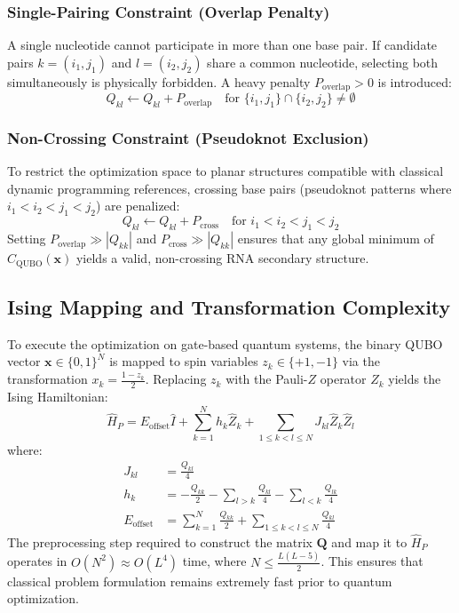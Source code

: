 \documentclass[11pt,a4paper]{article}
\begin{document}
	\subsubsection{Single-Pairing Constraint (Overlap Penalty)}
	A single nucleotide cannot participate in more than one base pair. If candidate pairs $k = (i_1, j_1)$ and $l = (i_2, j_2)$ share a common nucleotide, selecting both simultaneously is physically forbidden. A heavy penalty $P_{\text{overlap}} > 0$ is introduced:
	\begin{equation}
		Q_{kl} \gets Q_{kl} + P_{\text{overlap}} \quad \text{for } \{i_1, j_1\} \cap \{i_2, j_2\} \neq \emptyset
	\end{equation}
	
	\subsubsection{Non-Crossing Constraint (Pseudoknot Exclusion)}
	To restrict the optimization space to planar structures compatible with classical dynamic programming references, crossing base pairs (pseudoknot patterns where $i_1 < i_2 < j_1 < j_2$) are penalized:
	\begin{equation}
		Q_{kl} \gets Q_{kl} + P_{\text{cross}} \quad \text{for } i_1 < i_2 < j_1 < j_2
	\end{equation}
	Setting $P_{\text{overlap}} \gg |Q_{kk}|$ and $P_{\text{cross}} \gg |Q_{kk}|$ ensures that any global minimum of $C_{\text{QUBO}}(\mathbf{x})$ yields a valid, non-crossing RNA secondary structure.
	
	\subsection{Ising Mapping and Transformation Complexity}
	
	To execute the optimization on gate-based quantum systems, the binary QUBO vector $\mathbf{x} \in \{0, 1\}^N$ is mapped to spin variables $z_k \in \{+1, -1\}$ via the transformation $x_k = \frac{1 - z_k}{2}$. Replacing $z_k$ with the Pauli-$Z$ operator $\hat{Z}_k$ yields the Ising Hamiltonian:
	\begin{equation}
		\hat{H}_P = E_{\text{offset}} \hat{I} + \sum_{k=1}^N h_k \hat{Z}_k + \sum_{1 \le k < l \le N} J_{kl} \hat{Z}_k \hat{Z}_l
	\end{equation}
	where:
	\begin{align}
		J_{kl} &= \frac{Q_{kl}}{4} \\
		h_k &= -\frac{Q_{kk}}{2} - \sum_{l > k} \frac{Q_{kl}}{4} - \sum_{l < k} \frac{Q_{lk}}{4} \\
		E_{\text{offset}} &= \sum_{k=1}^N \frac{Q_{kk}}{2} + \sum_{1 \le k < l \le N} \frac{Q_{kl}}{4}
	\end{align}
	The preprocessing step required to construct the matrix $\mathbf{Q}$ and map it to $\hat{H}_P$ operates in $O(N^2) \approx O(L^4)$ time, where $N \le \frac{L(L-5)}{2}$. This ensures that classical problem formulation remains extremely fast prior to quantum optimization.
	
\end{document}
